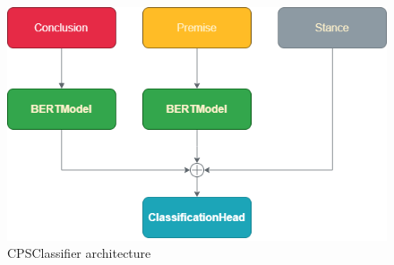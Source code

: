 \documentclass[11pt]{article}
\begin{document}
\begin{figure}[H]
        \centering
        \includegraphics[scale=0.50]{img/CPS.png}
        \caption{CPSClassifier architecture}
        \label{fig:con_prem_sta}
\end{figure}
\end{document}
